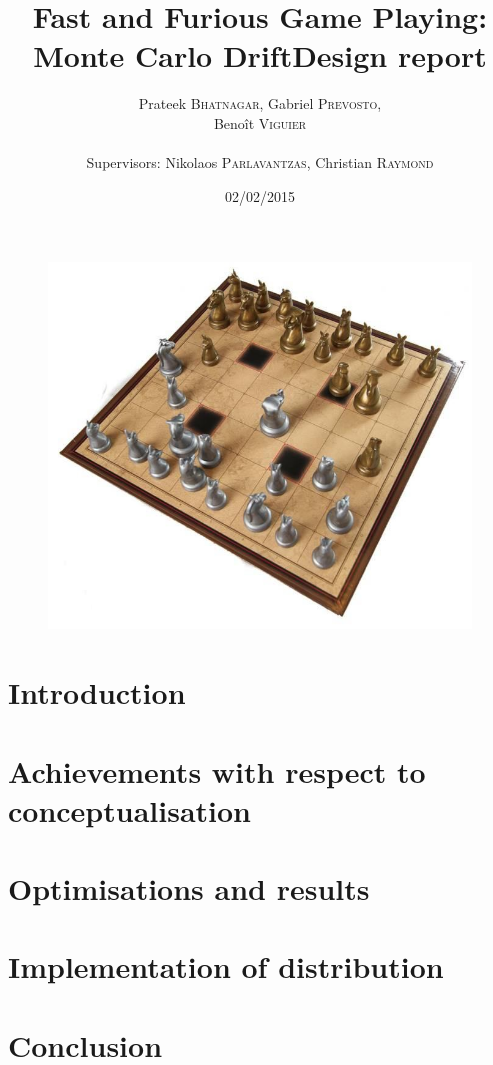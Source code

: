 \documentclass[12pt]{article}
\title{Fast and Furious Game Playing: Monte Carlo Drift\smallbreak Design report} %
\author{Prateek \textsc{Bhatnagar}, Gabriel \textsc{Prevosto}, \\
        Benoît \textsc{Viguier} \\
        \\
        Supervisors: Nikolaos \textsc{Parlavantzas}, Christian \textsc{Raymond}}
\date{02/02/2015}
\begin{document}
\maketitle

\begin{figure}[!h] 
\centerline{\includegraphics[scale=0.50]{Pictures/Arimaa}}
\end{figure}
\newpage

\tableofcontents
\newpage


\section{Introduction}				\label{sec:introduction} 		

\newpage
	\section{Achievements with respect to conceptualisation}			\label{sec:compare}			

\newpage
  \section{Optimisations and results}        \label{sec:optimisations}    
\newpage
  \section{Implementation of distribution}        \label{sec:distribution}    
\newpage
	\section{Conclusion}			\label{sec:conclusion}			
\newpage	
\end{document}
